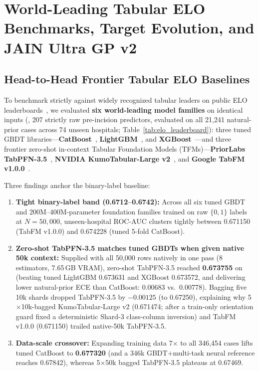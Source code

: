 \section{World-Leading Tabular ELO Benchmarks, Target Evolution, and JAIN Ultra GP v2}
\label{sec:benchmarks}

\subsection{Head-to-Head Frontier Tabular ELO Baselines}
To benchmark strictly against widely recognized tabular leaders on public ELO leaderboards~\cite{grinsztajn2022why,holzmuller2024better,erickson2025tabarena}, we evaluated \textbf{six world-leading model families} on identical inputs (, 207 strictly raw pre-incision predictors, evaluated on all 21,241 natural-prior cases across 74 unseen hospitals; Table~\ref{tab:elo_leaderboard}): three tuned GBDT libraries---\textbf{CatBoost}~\cite{prokhorenkova2018catboost}, \textbf{LightGBM}~\cite{ke2017lightgbm}, and \textbf{XGBoost}~\cite{chen2016xgboost}---and three frontier zero-shot in-context Tabular Foundation Models (TFMs)---\textbf{PriorLabs TabPFN-3.5}~\cite{hollmann2025tabpfn,jaeger2026tabpfn35}, \textbf{NVIDIA KumoTabular-Large v2}~\cite{qu2026kumotabular}, and \textbf{Google TabFM v1.0.0}~\cite{kong2026tabfm}.

Three findings anchor the binary-label baseline:
\begin{enumerate}
  \item \textbf{Tight binary-label band (0.6712--0.6742):} Across all six tuned GBDT and 200M--400M-parameter foundation families trained on raw $\{0,1\}$ labels at $N=50{,}000$, unseen-hospital ROC-AUC clusters tightly between 0.671150 (TabFM v1.0.0) and 0.674228 (tuned 5-fold CatBoost).
  \item \textbf{Zero-shot TabPFN-3.5 matches tuned GBDTs when given native 50k context:} Supplied with all 50,000 rows natively in one pass (8 estimators, 7.65\,GB VRAM), zero-shot TabPFN-3.5 reached \textbf{0.673755} on  (beating tuned LightGBM 0.673631 and XGBoost 0.673572, and delivering lower natural-prior ECE than CatBoost: 0.00683 vs.\ 0.00778). Bagging five 10k shards dropped TabPFN-3.5 by $-0.00125$ (to 0.67250), explaining why 5$\times$10k-bagged KumoTabular-Large v2 (0.671474; after a train-only orientation guard fixed a deterministic Shard-3 class-column inversion) and TabFM v1.0.0 (0.671150) trailed native-50k TabPFN-3.5.
  \item \textbf{Data-scale crossover:} Expanding training data 7$\times$ to all 346,454 cases lifts tuned CatBoost to \textbf{0.677320} (and a 346k GBDT$+$multi-task neural reference reaches 0.67842), whereas 5$\times$50k bagged TabPFN-3.5 plateaus at 0.67469.
\end{enumerate}

